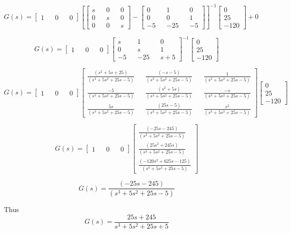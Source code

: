 \documentclass[12pt,a4paper]{article}
\begin{document}
	\[
	G(s) = 
	\begin{bmatrix}
		1 &   & 0 &   & 0 
	\end{bmatrix}
	[
	\begin{bmatrix}
		s &   & 0 &   & 0 \\
		0 &   & s &   & 0 \\
		0 &   & 0 &   & s 
	\end{bmatrix}
	-
	\begin{bmatrix}
		0  &   & 1   &   & 0  \\
		0  &   & 0   &   & 1  \\
		-5 &   & -25 &   & -5 
	\end{bmatrix}]^{-1}
	\begin{bmatrix}
		0    \\
		25   \\
		-120 
	\end{bmatrix} + 0
	\]
	
	\[
	G(s) = 
	\begin{bmatrix}
		1 &   & 0 &   & 0 
	\end{bmatrix}
	\begin{bmatrix}
		s  &   & 1   &   & 0   \\
		0  &   & s   &   & 1   \\
		-5 &   & -25 &   & s+5 
	\end{bmatrix}^{-1}
	\begin{bmatrix}
		0    \\
		25   \\
		-120 
	\end{bmatrix}
	\]
	
	\[
	G(s) = 
	\begin{bmatrix}
		1 &   & 0 &   & 0 
	\end{bmatrix}
	\begin{bmatrix}
		\frac{(s^2+5s+25)}{(s^3+5s^2+25s-5)} &   & \frac{(-s-5)}{(s^3+5s^2+25s-5)}   &   & \frac{1}{(s^3+5s^2+25s-5)}   \\
		\frac{-5}{(s^3+5s^2+25s-5)}          &   & \frac{(s^2+5s)}{(s^3+5s^2+25s-5)} &   & \frac{-s}{(s^3+5s^2+25s-5)}  \\
		\frac{5s}{(s^3+5s^2+25s-5)}          &   & \frac{(25s-5)}{(s^3+5s^2+25s-5)}  &   & \frac{s^2}{(s^3+5s^2+25s-5)} 
	\end{bmatrix}
	\begin{bmatrix}
		0    \\
		25   \\
		-120 
	\end{bmatrix}
	\]
	
	\[
	G(s) = 
	\begin{bmatrix}
		1 &   & 0 &   & 0 
	\end{bmatrix}
	\begin{bmatrix}
		\frac{(-25s-245)}{(s^3+5s^2+25s-5)}         \\
		\frac{(25s^2+245s)}{(s^3+5s^2+25s-5)}       \\
		\frac{(-120s^2+625s-125)}{(s^3+5s^2+25s-5)} 
	\end{bmatrix}
	\]
	
	\[
	G(s) = \frac{(-25s-245)}{(s^3+5s^2+25s-5)}
	\]
	
	
	Thus
	\[
	G(s) = \frac{25s + 245}{s^3 + 5s^2 + 25s + 5}
	\]
	
	
\end{document}
